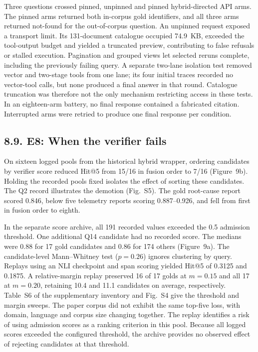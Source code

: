 Three questions crossed pinned, unpinned and pinned hybrid-directed API
arms. The pinned arms returned both in-corpus gold identifiers, and all
three arms returned not-found for the out-of-corpus question. An unpinned
request exposed a transport limit. Its 131-document catalogue occupied
74.9~KB, exceeded the tool-output budget and yielded a truncated
preview, contributing to false refusals or stalled execution. Pagination and
grouped views let selected reruns complete, including the previously
failing query. A separate two-lane isolation test removed vector and
two-stage tools from one lane; its four initial traces recorded no vector-tool
calls, but none produced a final answer in that round. Catalogue truncation
was therefore not the only mechanism restricting access in these tests. In an
eighteen-arm battery, no final response contained a fabricated citation.
Interrupted arms were retried to produce one final response per condition.

\subsection{8.9. E8: When the verifier fails}


On sixteen logged pools from the historical hybrid wrapper, ordering
candidates by verifier score reduced Hit@5 from 15/16 in fusion order to
7/16 (Figure~9b). Holding the recorded pools fixed isolates
the effect of sorting these candidates. The Q2 record illustrates the
demotion (Fig.~S5). The gold root-cause report scored 0.846, below five
telemetry reports scoring 0.887--0.926, and fell from first in fusion order
to eighth.

In the separate score archive, all 191 recorded values exceeded the
0.5 admission threshold. One additional Q14 candidate had no recorded
score. The medians were 0.88 for 17 gold candidates and 0.86 for 174
others (Figure~9a). The candidate-level Mann--Whitney
test ($p=0.26$) ignores clustering by query. Replays using an NLI
checkpoint and span scoring yielded Hit@5 of 0.3125 and 0.1875. A
relative-margin replay preserved 16 of 17 golds at $m=0.15$ and all 17
at $m=0.20$, retaining 10.4 and 11.1 candidates on average, respectively.
Table~S6 of the supplementary inventory and Fig.~S4 give the threshold
and margin sweeps. The paper corpus did not exhibit the same top-five
loss, with domain, language and corpus size changing together. The
replay identifies a risk of using admission scores as a ranking
criterion in this pool. Because all logged scores exceeded the configured
threshold, the archive provides no observed effect of rejecting
candidates at that threshold.

